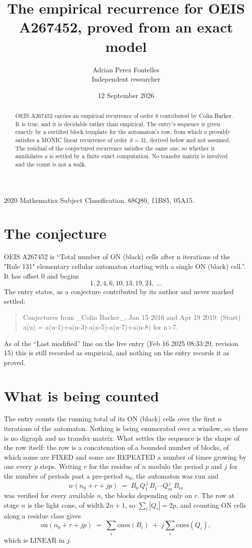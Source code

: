 \documentclass[11pt,a4paper]{article}
\title{The empirical recurrence for OEIS A267452, proved from an exact model}
\author{Adrian Perez Fontelles\\ \small Independent researcher}
\date{12 September 2026}
\theoremstyle{plain}
\theoremstyle{definition}
\begin{document}
\maketitle

\begin{abstract}
OEIS A267452 carries an empirical recurrence of order $8$ contributed by Colin Barker. It is true, and it is
decidable rather than empirical. The entry's sequence is given exactly by a certified block template for the automaton's row, from
which $a$ provably satisfies a MONIC linear recurrence of order $S=31$, derived below and not
assumed. The residual of the conjectured recurrence satisfies the same one, so whether it
annihilates $a$ is settled by a finite exact computation. No transfer matrix is involved and
the count is not a walk.
\end{abstract}

\noindent\small 2020 Mathematics Subject Classification. 68Q80, 11B85, 05A15.\normalsize

\section{The conjecture}

OEIS A267452 is ``Total number of ON (black) cells after n iterations of the "Rule 131" elementary cellular automaton starting with a single ON (black) cell.''. It has offset $0$ and begins
\[
1, 2, 4, 6, 10, 13, 19, 24,\ \dots
\]
The entry states, as a conjecture contributed by its author and never marked settled:
\begin{quote}
Conjectures from \_Colin Barker\_, Jan 15 2016 and Apr 19 2019: (Start) a(n) = a(n-1)+a(n-3)-a(n-5)-a(n-7)+a(n-8) for n>7.
\end{quote}
As of the ``Last modified'' line on the live entry (Feb 16 2025 08:33:29, revision 15)
this is still recorded as empirical, and nothing on the entry records it as proved.

\section{What is being counted}

The entry counts the running total of its ON (black) cells over the first $n$ iterations of the automaton. Nothing is being enumerated over a window, so there is
no digraph and no transfer matrix. What settles the sequence is the shape of the row itself:
the row is a concatenation of a bounded number of blocks, of which some are
FIXED and some are REPEATED a number of times growing by one every $p$ steps. Writing $r$ for
the residue of $n$ modulo the period $p$ and $j$ for the number of periods past a pre-period
$n_0$, the automaton was run and
\[
w(n_0 + r + jp)\;=\;B_0\,Q_1^{\,j}\,B_1\cdots Q_m^{\,j}\,B_m
\]
was verified for every available $n$, the blocks depending only on $r$. The
row at stage $n$ is the light cone, of width $2n+1$, so $\sum_i|Q_i|=2p$, and counting ON
cells along a residue class gives
\[
\mathrm{on}(n_0+r+jp)\;=\;\sum_i \mathrm{ones}(B_i)\;+\;j\sum_i \mathrm{ones}(Q_i),
\]
which is LINEAR in $j$.
\end{document}
